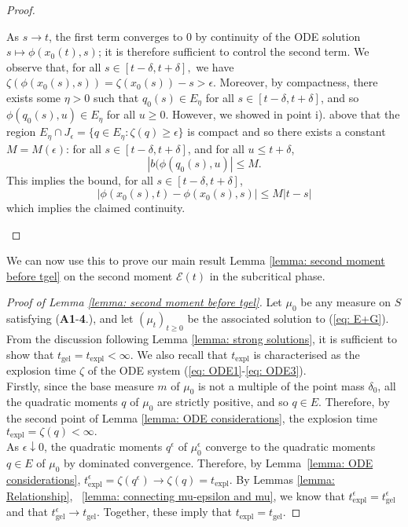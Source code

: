 \begin{proof}
\begin{enumerate}[label=\roman{*}).]
\begin{equation}
\end{equation} As $s\rightarrow t$, the first term converges to $0$ by continuity of the ODE solution $s\mapsto \phi(x_0(t),s)$; it is therefore sufficient to control the second term. We observe that, for all $s\in[t-\delta, t+\delta],$ we have $\zeta(\phi(x_0(s),s))=\zeta(x_0(s))-s>\epsilon$. Moreover, by compactness, there exists some $\eta>0$ such that $q_0(s) \in E_\eta$ for all $s\in [t-\delta, t+\delta]$, and so $\phi(q_0(s),u)\in E_\eta$ for all $u\ge 0.$ However, we showed in point i). above that the region $E_\eta \cap J_\epsilon=\{q \in E_\eta: \zeta(q)\geq\epsilon\}$ is compact  and so there exists a constant $M=M(\epsilon)$: for all $s\in[t-\delta, t+\delta]$, and for all $u \le t+\delta$, \begin{equation} |b(\phi(q_0(s), u)| \le M. \end{equation}
This implies the bound, for all $s\in[t-\delta,t+\delta]$, \begin{equation} |\phi(x_0(s), t)-\phi(x_0(s), s)| \le M|t-s|\end{equation} which implies the claimed continuity.
\end{enumerate}  \end{proof}



We can now use this to prove our main result Lemma \ref{lemma: second moment before tgel} on the second moment $\mathcal{E}(t)$ in the subcritical phase.





\begin{proof}[Proof of Lemma \ref{lemma: second moment before tgel}]
Let $\mu_0$ be any measure on $S$ satisfying (\textbf{A1}-\textbf{4}.), and let $(\mu_t)_{t\ge 0}$ be the associated solution to (\ref{eq: E+G}). From the discussion following Lemma \ref{lemma: strong solutions}, it is sufficient to show that $t_\mathrm{gel}=t_\mathrm{expl}<\infty$. We also recall that $t_\mathrm{expl}$ is characterised as the explosion time $\zeta$ of the ODE system (\ref{eq: ODE1}-\ref{eq: ODE3}). \medskip \\ Firstly, since the base measure $m$ of $\mu_0$ is not a multiple of the point mass $\delta_0$, all the quadratic moments $q$ of $\mu_0$ are strictly positive, and so $q \in E$. Therefore, by the second point of Lemma \ref{lemma: ODE considerations}, the explosion time $t_\mathrm{expl}=\zeta(q)<\infty.$\medskip \\ 
As $\epsilon \downarrow 0$, the quadratic moments $q^\epsilon$ of $\mu^\epsilon_0$ converge to the quadratic moments $q\in E$ of $\mu_0$ by dominated convergence.  Therefore, by Lemma~\ref{lemma: ODE considerations},  $t^\epsilon_\mathrm{expl}=\zeta(q^\epsilon)\rightarrow \zeta(q)= t_\mathrm{expl}$.
By Lemmas \ref{lemma: Relationship}, ~\ref{lemma: connecting mu-epsilon and mu}, we know that $t_\mathrm{expl}^\epsilon=t_\mathrm{gel}^\epsilon$ and that $t_\mathrm{gel}^\epsilon \rightarrow t_\mathrm{gel}$. Together, these imply that $t_\mathrm{expl} = t_\mathrm{gel}$.

\end{proof} 

